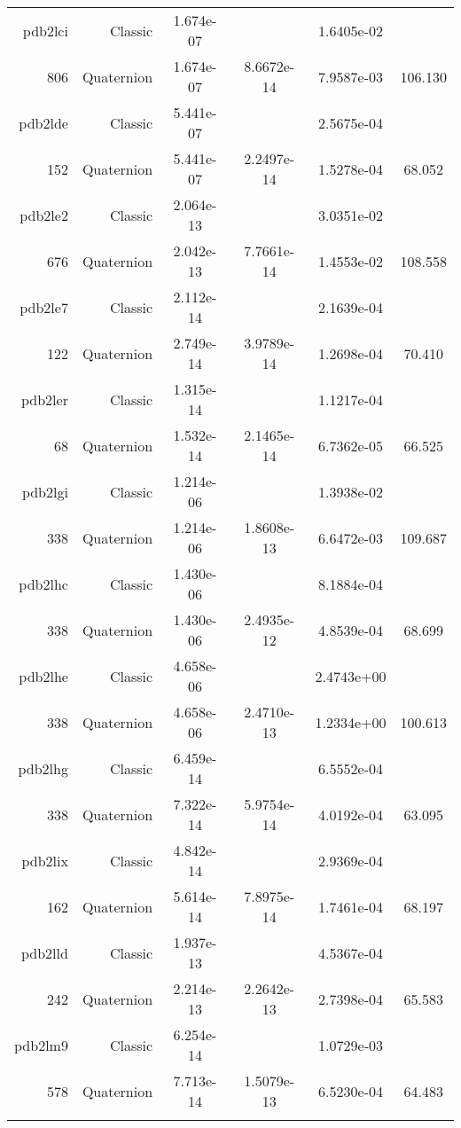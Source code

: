 \begin{xltabular}{\textwidth}{r|rS[table-format=1.3e+2]S[table-format=1.4e+2]S[table-format=1.4e+2]S[table-format=-1.3]}
pdb2lci & Classic & 1.674e-07 &  & 1.6405e-02 & \\
806 & Quaternion & 1.674e-07 & 8.6672e-14 & 7.9587e-03 & 106.130\\  \addlinespace
pdb2lde & Classic & 5.441e-07 &  & 2.5675e-04 & \\
152 & Quaternion & 5.441e-07 & 2.2497e-14 & 1.5278e-04 & 68.052\\  \addlinespace
pdb2le2 & Classic & 2.064e-13 &  & 3.0351e-02 & \\
676 & Quaternion & 2.042e-13 & 7.7661e-14 & 1.4553e-02 & 108.558\\  \addlinespace
pdb2le7 & Classic & 2.112e-14 &  & 2.1639e-04 & \\
122 & Quaternion & 2.749e-14 & 3.9789e-14 & 1.2698e-04 & 70.410\\  \addlinespace
pdb2ler & Classic & 1.315e-14 &  & 1.1217e-04 & \\
68 & Quaternion & 1.532e-14 & 2.1465e-14 & 6.7362e-05 & 66.525\\  \addlinespace
pdb2lgi & Classic & 1.214e-06 &  & 1.3938e-02 & \\
338 & Quaternion & 1.214e-06 & 1.8608e-13 & 6.6472e-03 & 109.687\\  \addlinespace
pdb2lhc & Classic & 1.430e-06 &  & 8.1884e-04 & \\
338 & Quaternion & 1.430e-06 & 2.4935e-12 & 4.8539e-04 & 68.699\\  \addlinespace
pdb2lhe & Classic & 4.658e-06 &  & 2.4743e+00 & \\
338 & Quaternion & 4.658e-06 & 2.4710e-13 & 1.2334e+00 & 100.613\\  \addlinespace
pdb2lhg & Classic & 6.459e-14 &  & 6.5552e-04 & \\
338 & Quaternion & 7.322e-14 & 5.9754e-14 & 4.0192e-04 & 63.095\\  \addlinespace
pdb2lix & Classic & 4.842e-14 &  & 2.9369e-04 & \\
162 & Quaternion & 5.614e-14 & 7.8975e-14 & 1.7461e-04 & 68.197\\  \addlinespace
pdb2lld & Classic & 1.937e-13 &  & 4.5367e-04 & \\
242 & Quaternion & 2.214e-13 & 2.2642e-13 & 2.7398e-04 & 65.583\\  \addlinespace
pdb2lm9 & Classic & 6.254e-14 &  & 1.0729e-03 & \\
578 & Quaternion & 7.713e-14 & 1.5079e-13 & 6.5230e-04 & 64.483\\  \addlinespace

\end{xltabular}
